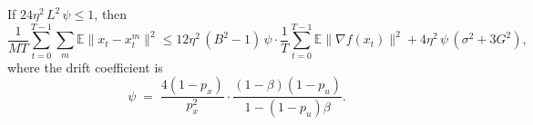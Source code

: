 \documentclass{article}
\begin{document}
\begin{lemma}
\label{lem:bound}
If $24\eta^2\,L^2\,\psi \leq 1$, then
\begin{equation}
\frac{1}{MT}\sum_{t=0}^{T-1}\sum_m\mathbb{E}\|x_t - x_t^m\|^2
\leq 12\eta^2\,(B^2-1)\,\psi\cdot
\frac{1}{T}\sum_{t=0}^{T-1}\mathbb{E}\|\nabla f(x_t)\|^2
+ 4\eta^2\,\psi\,(\sigma^2 + 3G^2),
\label{eq:lem_bound_statement}
\end{equation}
where the drift coefficient is
\begin{equation}
\psi \;=\; \frac{4(1-p_x)}{p_x^2}\cdot
\frac{(1-\beta)(1-p_u)}{1-(1-p_u)\beta}.
\label{eq:psi_def_lemma}
\end{equation}
\end{lemma}
\end{document}
